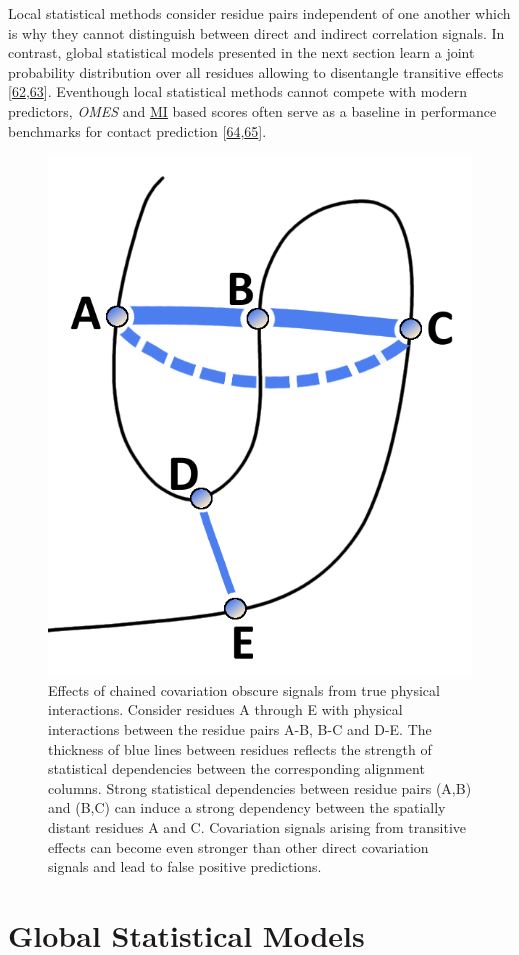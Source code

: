 \documentclass[11pt,a4paper,twoside]{book}
\theoremstyle{definition}
\theoremstyle{definition}
\theoremstyle{remark}
\begin{document}
Local statistical methods consider residue pairs independent of one
another which is why they cannot distinguish between direct and indirect
correlation signals. In contrast, global statistical models presented in
the next section learn a joint probability distribution over all
residues allowing to disentangle transitive effects
{[}\protect\hyperlink{ref-Burger2010}{62},\protect\hyperlink{ref-Weigt2009}{63}{]}.
Eventhough local statistical methods cannot compete with modern
predictors, \emph{OMES} and \protect\hyperlink{abbrev}{MI} based scores
often serve as a baseline in performance benchmarks for contact
prediction
{[}\protect\hyperlink{ref-DeJuan2013}{64},\protect\hyperlink{ref-Jones2012}{65}{]}.












\begin{figure}

{\centering \includegraphics[width=0.25\linewidth]{img/intro/transitive_effects} 

}

\caption{Effects of chained covariation obscure
signals from true physical interactions. Consider residues A through E
with physical interactions between the residue pairs A-B, B-C and D-E.
The thickness of blue lines between residues reflects the strength of
statistical dependencies between the corresponding alignment columns.
Strong statistical dependencies between residue pairs (A,B) and (B,C)
can induce a strong dependency between the spatially distant residues A
and C. Covariation signals arising from transitive effects can become
even stronger than other direct covariation signals and lead to false
positive predictions.}\label{fig:transitive-effect}
\end{figure}

\section{Global Statistical Models}\label{global-methods}
\end{document}
